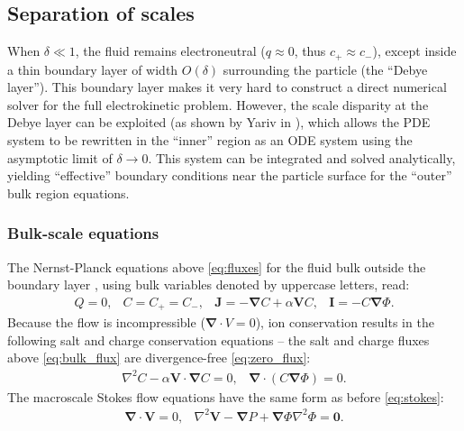 \documentclass[MSc,beforeExam]{iitcsthesis}
\newcommand{\pars}[1]{\left(#1\right)}
\newcommand\Laplacian{\nabla^2}
\newcommand\bnabla{\boldsymbol{\nabla}}
\newcommand\bV{\boldsymbol{V}}
\newcommand\bI{\boldsymbol{I}}
\newcommand\bJ{\boldsymbol{J}}
\newcommand\bzero{\boldsymbol{0}}
\begin{document}
\subsection{Separation of scales}
When $\delta \ll 1$, 
the fluid remains electroneutral ($q \approx 0$, thus $c_+ \approx c_-$), 
except inside a thin boundary layer of width $O(\delta)$ 
surrounding the particle (the ``Debye layer'').
This boundary layer makes it very hard to construct 
a direct numerical solver for the full electrokinetic problem.
However, the scale disparity at the Debye layer can be exploited
(as shown by Yariv in \cite{yariv2010asymptotic}), 
which allows the PDE system to be rewritten in the ``inner'' region 
as an ODE system using the asymptotic limit of $\delta \rightarrow 0$.
This system can be integrated and solved analytically,
yielding ``effective'' boundary conditions near
the particle surface for the ``outer'' bulk region equations.

\subsubsection  {Bulk-scale equations}
The Nernst-Planck equations above \eqref{eq:fluxes} for the fluid bulk outside
the boundary layer \cite{yariv2010asymptotic}, 
using bulk variables denoted by uppercase letters, read:
\begin{equation} \begin{array}{cccc} \label{eq:bulk_flux}
  Q = 0, &
  C = C_+ = C_-, &
\bJ = -\bnabla C + \alpha \bV C, &
\bI = -C \bnabla \varPhi.
\end{array}\end{equation}
Because the flow is incompressible ($\bnabla \cdot V = 0$), 
ion conservation results in the following 
salt and charge conservation equations -- the salt and charge fluxes above 
\eqref{eq:bulk_flux} are divergence-free
\eqref{eq:zero_flux}:
\begin{equation} \begin{array}{ccc}
\label{eq:salt_charge}
\Laplacian C - \alpha \bV \cdot \bnabla C = 0, &
\bnabla \cdot \pars{ C \bnabla \varPhi } = 0.
\end{array}\end{equation}
The macroscale Stokes flow equations have the same form as before \eqref{eq:stokes}:
\begin{equation}
\begin{array}{ccc}
\bnabla \cdot \bV = 0, &   
\Laplacian \bV - \bnabla P + \bnabla \varPhi \Laplacian \varPhi = \bzero.
\end{array}
\end{equation}
\end{document}
